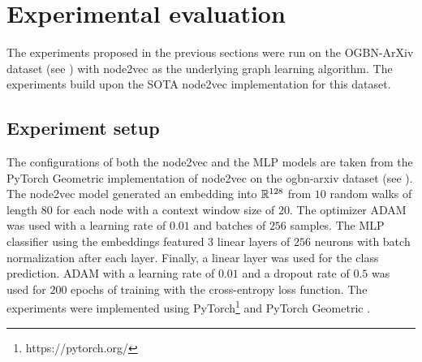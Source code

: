 \section{Experimental evaluation}\label{sec:experiments}

The experiments proposed in the previous sections were run on the OGBN-ArXiv dataset (see \cite{hu_open_2021}) with node2vec as the underlying graph learning algorithm. The experiments build upon the SOTA node2vec implementation for this dataset.

\subsection{Experiment setup}

The configurations of both the node2vec and the MLP models are taken from the PyTorch Geometric implementation of node2vec on the ogbn-arxiv dataset (see \cite{paszke_pytorch_2019}). The node2vec model generated an embedding into \( \mathbb{R}^{128} \) from \( 10 \) random walks of length \( 80 \) for each node with a context window size of \( 20 \). The optimizer ADAM \cite{kingma_adam:_2017} was used with a learning rate of \( 0.01 \) and batches of \( 256 \) samples. The MLP classifier using the embeddings featured \( 3 \) linear layers of \( 256 \) neurons with batch normalization after each layer. Finally, a linear layer was used for the class prediction. ADAM with a learning rate of \( 0.01 \) and a dropout rate of \( 0.5 \) was used for \( 200 \) epochs of training with the cross-entropy loss function. The experiments were implemented using PyTorch\footnote{https://pytorch.org/} and PyTorch Geometric \cite{paszke_pytorch_2019}.

